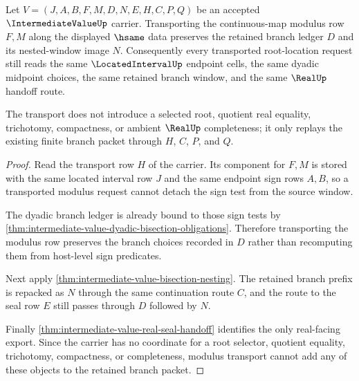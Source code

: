 \begin{theorem}
\label{thm:intermediate-value-modulus-branch-transport}
Let $V=(J,A,B,F,M,D,N,E,H,C,P,Q)$ be an accepted $\IntermediateValueUp$ carrier. Transporting the continuous-map modulus row $F,M$ along the displayed $\hsame$ data preserves the retained branch ledger $D$ and its nested-window image $N$. Consequently every transported root-location request still reads the same $\LocatedIntervalUp$ endpoint cells, the same dyadic midpoint choices, the same retained branch window, and the same $\RealUp$ handoff route.

The transport does not introduce a selected root, quotient real equality, trichotomy, compactness, or ambient $\RealUp$ completeness; it only replays the existing finite branch packet through $H$, $C$, $P$, and $Q$.
\end{theorem}
\begin{proof}
Read the transport row $H$ of the carrier. Its component for $F,M$ is stored with the same located interval row $J$ and the same endpoint sign rows $A,B$, so a transported modulus request cannot detach the sign test from the source window.

The dyadic branch ledger is already bound to those sign tests by \autoref{thm:intermediate-value-dyadic-bisection-obligations}. Therefore transporting the modulus row preserves the branch choices recorded in $D$ rather than recomputing them from host-level sign predicates.

Next apply \autoref{thm:intermediate-value-bisection-nesting}. The retained branch prefix is repacked as $N$ through the same continuation route $C$, and the route to the seal row $E$ still passes through $D$ followed by $N$.

Finally \autoref{thm:intermediate-value-real-seal-handoff} identifies the only real-facing export. Since the carrier has no coordinate for a root selector, quotient equality, trichotomy, compactness, or completeness, modulus transport cannot add any of these objects to the retained branch packet.
\end{proof}

